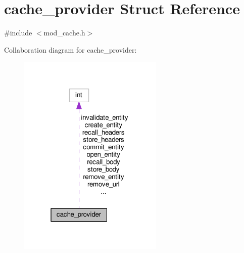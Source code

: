 \hypertarget{structcache__provider}{}\section{cache\+\_\+provider Struct Reference}
\label{structcache__provider}


{\ttfamily \#include $<$mod\+\_\+cache.\+h$>$}



Collaboration diagram for cache\+\_\+provider\+:
\nopagebreak
\begin{figure}[H]
\begin{center}
\leavevmode
\includegraphics[width=196pt]{structcache__provider__coll__graph}
\end{center}
\end{figure}
